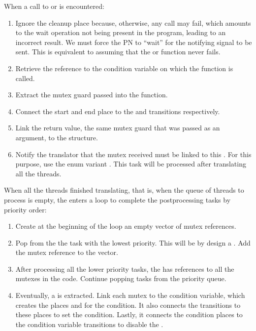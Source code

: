 When a call to 
or  is encountered:

\begin{enumerate}
      \item Ignore the cleanup place because, otherwise, any call may fail,
            which amounts to the wait operation not being present in the program,
            leading to an incorrect result.
            We must force the \acrshort{PN}
            to ``wait'' for the notifying signal to be sent.
            This is equivalent to assuming that the 
            or  function never fails.
      \item Retrieve the  reference to the condition variable
            on which the function is called.
      \item Extract the mutex guard passed into the function.
      \item Connect the start and end place to the
             and  transitions respectively.
      \item Link the return value, the same mutex guard that was passed as an argument,
            to the  structure.
      \item Notify the translator that the mutex received must be linked to this .
            For this purpose, use the enum variant .
            This task will be processed after translating all the threads.
\end{enumerate}

When all the threads finished translating, that is,
when the queue of threads to process is empty,
the  enters a loop
to complete the postprocessing tasks by priority order:

\begin{enumerate}
      \item Create at the beginning of the loop an empty vector of mutex references.
      \item Pop from the  the task with the lowest priority.
            This will be by design a .
            Add the mutex reference to the vector.
      \item After processing all the lower priority tasks,
            the  has references to all the mutexes in the code.
            Continue popping tasks from the priority queue.
      \item Eventually, a  is extracted.
            Link each mutex to the condition variable,
            which creates the places 
            and  for the condition.
            It also connects the  transitions
            to these places to set the condition.
            Lastly, it connects the condition places to the condition variable transitions
            to disable the .
\end{enumerate}

